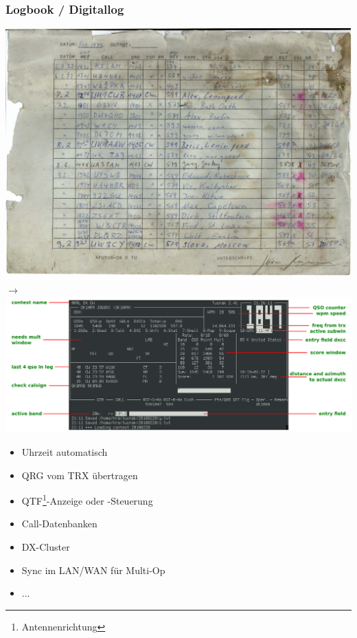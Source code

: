 \begin{frame}
    \frametitle{Logbook / Digitallog}

    \begin{center}
        \includegraphics[height=0.25\textheight]{bv13/DK0TU_LOG_KW_1972-02_Auszug.jpg}
        $\rightarrow$
        \includegraphics[height=0.25\textheight]{bv13/tucnak_Hf-10.png}
    \end{center}

    \begin{itemize}
        \item Uhrzeit automatisch
        \item QRG vom TRX übertragen
        \item QTF\footnote{Antennenrichtung}-Anzeige oder -Steuerung
        \item Call-Datenbanken
        \item DX-Cluster
        \item Sync im LAN/WAN für Multi-Op
        \item ...
    \end{itemize}

\end{frame}


